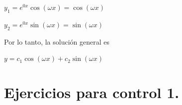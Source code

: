 \documentclass{article}
\theoremstyle{plain}
\theoremstyle{definition}
\begin{document}
\begin{center}
$y_1 = e^{0x} \cos(\omega x) = \cos(\omega x)$
\end{center}

\begin{center}
$y_2 = e^{0x} \sin(\omega x) = \sin(\omega x)$
\end{center}

Por lo tanto, la solución general es

\begin{center}
$y= c_1\cos(\omega x) + c_2 \sin(\omega x)$
\end{center}



\newpage

\section{Ejercicios para control 1.}
\end{document}
